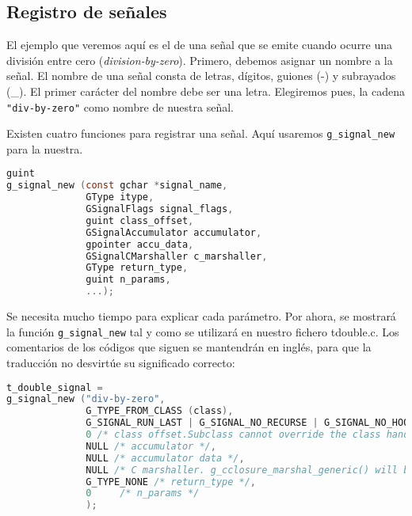 \subsection{Registro de señales}
El ejemplo que veremos aquí es el de una señal que se emite cuando ocurre una división entre cero
(\emph{division-by-zero}). Primero, debemos asignar un nombre a la señal. El nombre de una señal consta
de letras, dígitos, guiones (-) y subrayados (\_). El primer carácter del nombre debe ser una letra. Elegiremos
pues, la cadena \texttt{"div-by-zero"} como nombre de nuestra señal.

Existen cuatro funciones para registrar una señal. Aquí usaremos \texttt{g\_signal\_new} para la nuestra.

\begin{lstlisting}[language=C, numbers=none]
guint
g_signal_new (const gchar *signal_name,
              GType itype,
              GSignalFlags signal_flags,
              guint class_offset,
              GSignalAccumulator accumulator,
              gpointer accu_data,
              GSignalCMarshaller c_marshaller,
              GType return_type,
              guint n_params,
              ...);
\end{lstlisting}

Se necesita mucho tiempo para explicar cada parámetro. Por ahora, se mostrará la función
\texttt{g\_signal\_new} tal y como se utilizará en nuestro fichero \textsf{tdouble.c}. Los comentarios
de los códigos que siguen se mantendrán en inglés, para que la traducción no desvirtúe su significado
correcto:
\begin{lstlisting}[language=C, numbers=none]
t_double_signal =
g_signal_new ("div-by-zero",
              G_TYPE_FROM_CLASS (class),
              G_SIGNAL_RUN_LAST | G_SIGNAL_NO_RECURSE | G_SIGNAL_NO_HOOKS,
              0 /* class offset.Subclass cannot override the class handler (default handler). */,
              NULL /* accumulator */,
              NULL /* accumulator data */,
              NULL /* C marshaller. g_cclosure_marshal_generic() will be used */,
              G_TYPE_NONE /* return_type */,
              0     /* n_params */
              );
\end{lstlisting}

